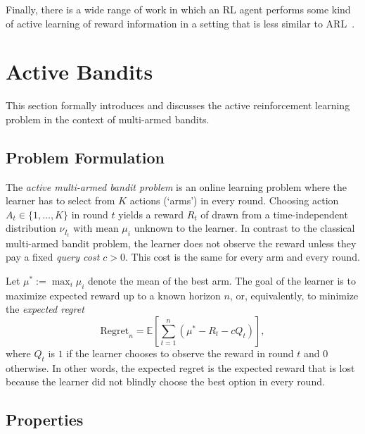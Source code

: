 \documentclass{article}
\newcommand{\regret}{\mathrm{Regret}}
\begin{document}
Finally, there is a wide range of work in which an RL agent performs some kind of active learning of reward information in a setting that is less similar to ARL~\citep{weng2013interactive, lopes2014active, regan2011robust}. 





\section{Active Bandits}

This section formally introduces and discusses
the active reinforcement learning problem
in the context of multi-armed bandits.



\subsection{Problem Formulation}

The \emph{active multi-armed bandit problem} is
an online learning problem
where the learner has to select from $K$ actions (`arms') in every round.
Choosing action $A_t \in \{ 1, \ldots, K \}$ in round $t$
yields a reward $R_t$ of
drawn from a time-independent distribution $\nu_{I_t}$
with mean $\mu_i$ unknown to the learner.
In contrast to the classical multi-armed bandit problem,
the learner does not observe the reward
unless they pay a fixed \emph{query cost $c > 0$}.
This cost is the same for every arm and every round.

Let $\mu^* := \max_i \mu_i$ denote the mean of the best arm.
The goal of the learner is to maximize expected reward up to a known horizon $n$,
or, equivalently, to minimize the \emph{expected regret}
\[
\regret_n = \mathbb{E} \left[ \sum_{t=1}^n (\mu^* - R_t - c Q_t) \right],
\]
where $Q_t$ is $1$ if the learner chooses to observe the reward in round $t$ and $0$ otherwise.
In other words, the expected regret is the expected reward
that is lost
because the learner did not blindly choose the best option in every round.



\subsection{Properties}
\end{document}
